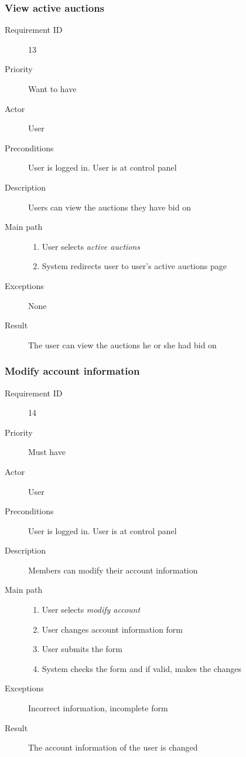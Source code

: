 		\subsubsection{View active auctions}
			\begin{description}
				\item[Requirement ID] 13
				\item[Priority] Want to have
				\item[Actor] User
				\item[Preconditions] User is logged in. User is at control panel
				\item[Description] Users can view the auctions they have bid on
				\item[Main path]
 					\begin{enumerate}
						\item User selects \emph{active auctions}
						\item System redirects user to user's active auctions page
					\end{enumerate}
				\item[Exceptions] None
				\item[Result] The user can view the auctions he or she had bid on
			\end{description}
		\subsubsection{Modify account information}
			\begin{description}
				\item[Requirement ID] 14
				\item[Priority] Must have
				\item[Actor] User
				\item[Preconditions] User is logged in. User is at control panel
				\item[Description] Members can modify their account information
				\item[Main path]
 					\begin{enumerate}
						\item User selects \emph{modify account}
						\item User changes account information form
						\item User submits the form
						\item System checks the form and if valid, makes the changes
					\end{enumerate}
				\item[Exceptions] Incorrect information, incomplete form
				\item[Result] The account information of the user is changed
			\end{description}
